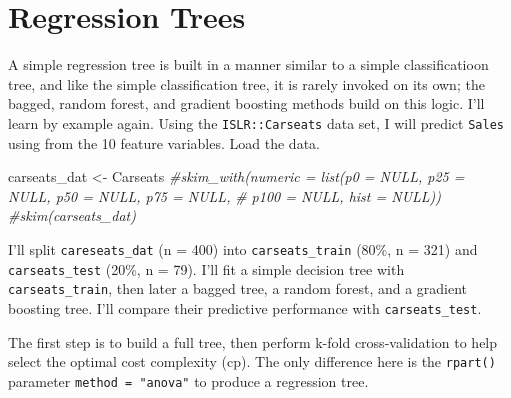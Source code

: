 \documentclass[
]{book}
\newenvironment{Shaded}{\begin{snugshade}}{\end{snugshade}}
\newcommand{\CommentTok}[1]{\textcolor[rgb]{0.56,0.35,0.01}{\textit{#1}}}
\newcommand{\DataTypeTok}[1]{\textcolor[rgb]{0.13,0.29,0.53}{#1}}
\newcommand{\DecValTok}[1]{\textcolor[rgb]{0.00,0.00,0.81}{#1}}
\newcommand{\FloatTok}[1]{\textcolor[rgb]{0.00,0.00,0.81}{#1}}
\newcommand{\KeywordTok}[1]{\textcolor[rgb]{0.13,0.29,0.53}{\textbf{#1}}}
\newcommand{\NormalTok}[1]{#1}
\newcommand{\OperatorTok}[1]{\textcolor[rgb]{0.81,0.36,0.00}{\textbf{#1}}}
\newcommand{\OtherTok}[1]{\textcolor[rgb]{0.56,0.35,0.01}{#1}}
\newcommand{\StringTok}[1]{\textcolor[rgb]{0.31,0.60,0.02}{#1}}
\begin{document}
\hypertarget{regression-trees}{%
\section{Regression Trees}\label{regression-trees}}

A simple regression tree is built in a manner similar to a simple classificatioon tree, and like the simple classification tree, it is rarely invoked on its own; the bagged, random forest, and gradient boosting methods build on this logic. I'll learn by example again. Using the \texttt{ISLR::Carseats} data set, I will predict \texttt{Sales} using from the 10 feature variables. Load the data.

\begin{Shaded}
\begin{Highlighting}[]
\NormalTok{carseats_dat <-}\StringTok{ }\NormalTok{Carseats}
\CommentTok{#skim_with(numeric = list(p0 = NULL, p25 = NULL, p50 = NULL, p75 = NULL, }
\CommentTok{#                                p100 = NULL, hist = NULL))}
\CommentTok{#skim(carseats_dat)}
\end{Highlighting}
\end{Shaded}

I'll split \texttt{careseats\_dat} (n = 400) into \texttt{carseats\_train} (80\%, n = 321) and \texttt{carseats\_test} (20\%, n = 79). I'll fit a simple decision tree with \texttt{carseats\_train}, then later a bagged tree, a random forest, and a gradient boosting tree. I'll compare their predictive performance with \texttt{carseats\_test}.

\begin{Shaded}
\end{Shaded}

The first step is to build a full tree, then perform k-fold cross-validation to help select the optimal cost complexity (cp). The only difference here is the \texttt{rpart()} parameter \texttt{method\ =\ "anova"} to produce a regression tree.
\end{document}

